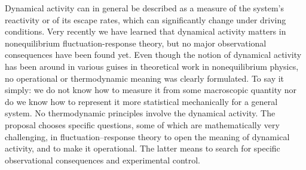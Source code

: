 Dynamical activity can in general be described as a measure of the system’s reactivity or of its escape rates, which can significantly change under driving conditions. Very recently we have learned that dynamical activity matters in nonequilibrium fluctuation-response theory, but no major observational consequences have been found yet.
Even though the notion of dynamical activity has been around in various guises in theoretical work in nonequilibrium physics, no operational or thermodynamic meaning was clearly formulated. To say it simply: we do not know how to measure it from some macroscopic quantity nor do we know how to represent it more statistical mechanically for a general system. No thermodynamic principles involve the dynamical activity.  The proposal chooses specific questions, some of which are mathematically very challenging, in fluctuation–response theory to open the meaning of dynamical activity, and to make it operational. The latter means to search for specific observational consequences and experimental control.
